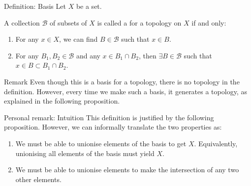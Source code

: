 \documentclass[a4paper]{article}
\begin{document}
\begin{parag}{Definition: Basis}
    Let $X$ be a set.

    A collection $\mathcal{B}$ of subsets of $X$ is called a  for a topology on $X$ if and only:
    \begin{enumerate}
        \item For any $x \in X$, we can find $B \in \mathcal{B}$ such that $x \in B$.
        \item For any $B_1, B_2 \in \mathcal{B}$ and any $x \in B_1 \cap B_2$, then $\exists B \in \mathcal{B}$ such that $x \in B \subset B_1 \cap B_2$.
    \end{enumerate}

    \begin{subparag}{Remark}
        Even though this is a basis for a topology, there is no topology in the definition. However, every time we make such a basis, it generates a topology, as explained in the following proposition.
    \end{subparag}

    \begin{subparag}{Personal remark: Intuition}
        This definition is justified by the following proposition. However, we can informally translate the two properties as:
        \begin{enumerate}
            \item We must be able to unionise elements of the basis to get $X$. Equivalently, unionising all elements of the basis must yield $X$.
            \item We must be able to unionise elements to make the intersection of any two other elements.
        \end{enumerate}
    \end{subparag}
\end{parag}
\end{document}
